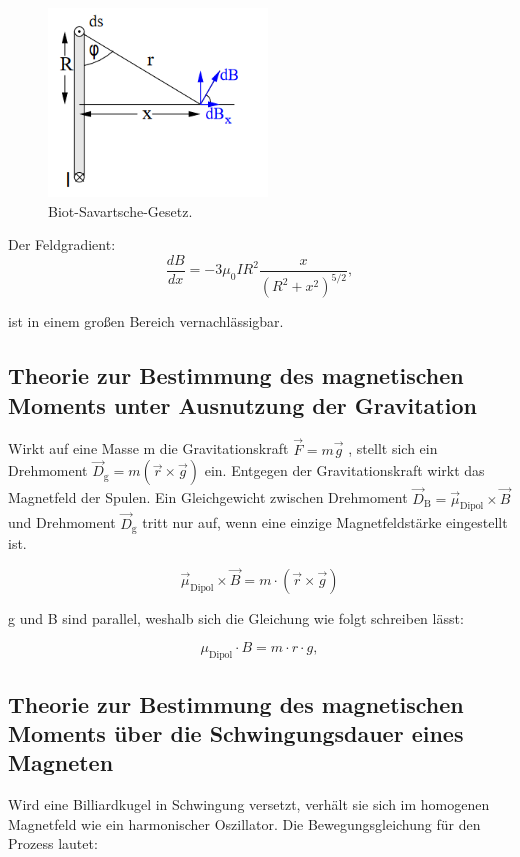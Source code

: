 \begin{figure}[H]
  \centering
  \includegraphics[height=5cm]{Screenshot (6)}
  \caption{Biot-Savartsche-Gesetz.}
  \label{fig:drill}
\end{figure}

Der Feldgradient: 
\begin{equation}
    \frac{dB}{dx} = -3\mu_\text{0}IR^2 \frac{x}{(R^2+x^2)^{5/2}} ,
\end{equation}

ist in einem großen Bereich vernachlässigbar.




\subsection{Theorie zur Bestimmung des magnetischen Moments unter Ausnutzung der Gravitation}
Wirkt auf eine Masse m die Gravitationskraft $\vec{F} = m \vec{g}$ , stellt sich ein Drehmoment $\vec{D}_\text{g}= m (\vec{r} \times \vec{g}) $ ein.
Entgegen der Gravitationskraft wirkt das Magnetfeld der Spulen. Ein Gleichgewicht zwischen Drehmoment $\vec{D}_\text{B} = \vec{\mu}_\text{Dipol} \times \vec{B}$ und Drehmoment $\vec{D}_\text{g}$ tritt nur auf, wenn eine einzige Magnetfeldstärke eingestellt ist.

\begin{equation}
   \vec{\mu}_\text{Dipol}\times\vec{B} = m \cdot (\vec{r}\times\vec{g})
\end{equation}


g und B sind parallel, weshalb sich die Gleichung wie folgt schreiben lässt:

\begin{equation}
    \mu_\text{Dipol}\cdot B = m \cdot r \cdot g  ,
\end{equation}


\subsection{Theorie zur Bestimmung des magnetischen Moments über die Schwingungsdauer eines Magneten}
Wird eine Billiardkugel in Schwingung versetzt, verhält sie sich im homogenen Magnetfeld wie ein harmonischer Oszillator.
Die Bewegungsgleichung für den Prozess lautet:

